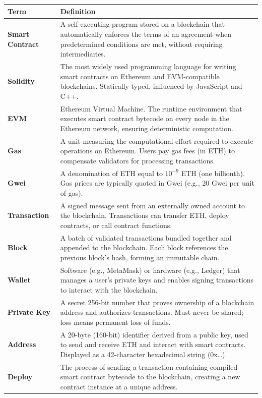 \documentclass[11pt,a4paper]{article}
\begin{document}
\renewcommand{\arraystretch}{1.25}
\noindent\begin{tabular}{@{}p{3.6cm}p{11.0cm}@{}}
\toprule
\textbf{Term} & \textbf{Definition} \\
\midrule
\textbf{Smart Contract}  & A self-executing program stored on a blockchain that automatically enforces the terms of an agreement when predetermined conditions are met, without requiring intermediaries. \\
\textbf{Solidity}         & The most widely used programming language for writing smart contracts on Ethereum and EVM-compatible blockchains. Statically typed, influenced by JavaScript and C++. \\
\textbf{EVM}              & Ethereum Virtual Machine. The runtime environment that executes smart contract bytecode on every node in the Ethereum network, ensuring deterministic computation. \\
\textbf{Gas}              & A unit measuring the computational effort required to execute operations on Ethereum. Users pay gas fees (in ETH) to compensate validators for processing transactions. \\
\textbf{Gwei}             & A denomination of ETH equal to $10^{-9}$ ETH (one billionth). Gas prices are typically quoted in Gwei (e.g., 20 Gwei per unit of gas). \\
\textbf{Transaction}      & A signed message sent from an externally owned account to the blockchain. Transactions can transfer ETH, deploy contracts, or call contract functions. \\
\textbf{Block}            & A batch of validated transactions bundled together and appended to the blockchain. Each block references the previous block's hash, forming an immutable chain. \\
\textbf{Wallet}           & Software (e.g., MetaMask) or hardware (e.g., Ledger) that manages a user's private keys and enables signing transactions to interact with the blockchain. \\
\textbf{Private Key}      & A secret 256-bit number that proves ownership of a blockchain address and authorizes transactions. Must never be shared; loss means permanent loss of funds. \\
\textbf{Address}          & A 20-byte (160-bit) identifier derived from a public key, used to send and receive ETH and interact with smart contracts. Displayed as a 42-character hexadecimal string (0x\ldots). \\
\textbf{Deploy}           & The process of sending a transaction containing compiled smart contract bytecode to the blockchain, creating a new contract instance at a unique address. \\

\end{tabular}
\end{document}
